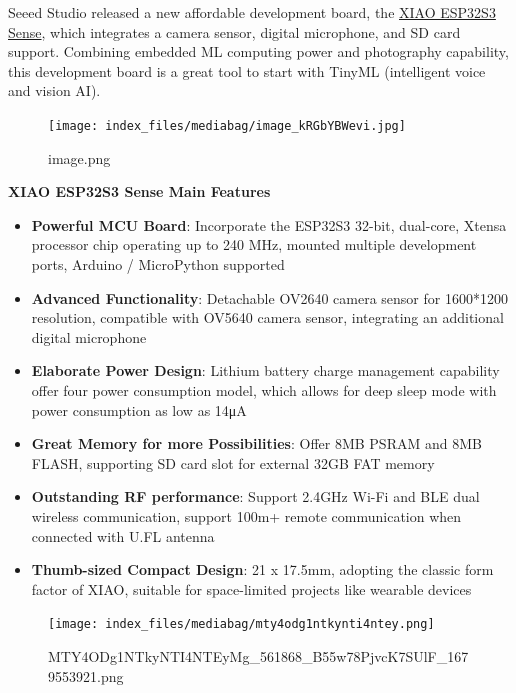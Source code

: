 \documentclass[
  letterpaper,
  DIV=11,
  numbers=noendperiod]{scrreprt}
\providecommand{\tightlist}{%
  \setlength{\itemsep}{0pt}\setlength{\parskip}{0pt}}\usepackage{longtable,booktabs,array}
\begin{document}
Seeed Studio released a new affordable development board, the
\href{https://www.seeedstudio.com/XIAO-ESP32S3-Sense-p-5639.html}{XIAO
ESP32S3 Sense}, which integrates a camera sensor, digital microphone,
and SD card support. Combining embedded ML computing power and
photography capability, this development board is a great tool to start
with TinyML (intelligent voice and vision AI).

\begin{figure}[H]

{\centering \texttt{[image: index\_files/mediabag/image\_kRGbYBWevi.jpg]}

}

\caption{image.png}

\end{figure}

\textbf{XIAO ESP32S3 Sense Main Features}

\begin{itemize}
\tightlist
\item
  \textbf{Powerful MCU Board}: Incorporate the ESP32S3 32-bit,
  dual-core, Xtensa processor chip operating up to 240 MHz, mounted
  multiple development ports, Arduino / MicroPython supported
\item
  \textbf{Advanced Functionality}: Detachable OV2640 camera sensor for
  1600*1200 resolution, compatible with OV5640 camera sensor,
  integrating an additional digital microphone
\item
  \textbf{Elaborate Power Design}: Lithium battery charge management
  capability offer four power consumption model, which allows for deep
  sleep mode with power consumption as low as 14μA
\item
  \textbf{Great Memory for more Possibilities}: Offer 8MB PSRAM and 8MB
  FLASH, supporting SD card slot for external 32GB FAT memory
\item
  \textbf{Outstanding RF performance}: Support 2.4GHz Wi-Fi and BLE dual
  wireless communication, support 100m+ remote communication when
  connected with U.FL antenna
\item
  \textbf{Thumb-sized Compact Design}: 21 x 17.5mm, adopting the classic
  form factor of XIAO, suitable for space-limited projects like wearable
  devices
\end{itemize}

\begin{figure}[H]

{\centering \texttt{[image: index\_files/mediabag/mty4odg1ntkynti4ntey.png]}

}

\caption{MTY4ODg1NTkyNTI4NTEyMg\_561868\_B55w78PjvcK7SUlF\_1679553921.png}

\end{figure}
\end{document}
